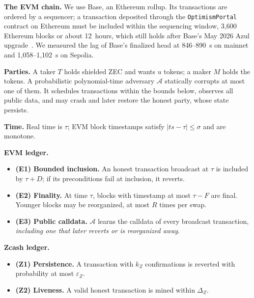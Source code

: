 \documentclass[10pt,letterpaper]{article}
\makeatletter
\renewcommand\section{\@startsection{section}{1}{\z@}{-1.3em}{0.45em}{\normalfont\large\bfseries}}
\theoremstyle{plain}
\theoremstyle{definition}
\newcommand{\fn}[1]{\texttt{#1}}
\makeatother
\begin{document}
\textbf{The EVM chain.} We use Base, an Ethereum rollup. Its transactions are ordered by a
sequencer; a transaction deposited through the \fn{OptimismPortal} contract on Ethereum must be
included within the sequencing window, 3{,}600 Ethereum blocks or about 12~hours, which still
holds after Base's May 2026 Azul upgrade~\cite{basereliab,opforced}. We measured the lag of
Base's finalized head at 846--890~s on mainnet and 1{,}058--1{,}102~s on Sepolia.

\section{Model and Goals}

\textbf{Parties.} A taker $T$ holds shielded ZEC and wants $u$ tokens; a maker $M$ holds the
tokens. A probabilistic polynomial-time adversary $\mathcal{A}$ statically corrupts at most one of
them. It schedules transactions within the bounds below, observes all public data, and may
crash and later restore the honest party, whose state persists.

\textbf{Time.} Real time is $\tau$; EVM block timestamps satisfy $|ts - \tau| \le \sigma$ and are
monotone.

\textbf{EVM ledger.}
\begin{itemize}\setlength\itemsep{0.05em}
\item \textbf{(E1) Bounded inclusion.} An honest transaction broadcast at $\tau$ is included by
$\tau + D$; if its preconditions fail at inclusion, it reverts.
\item \textbf{(E2) Finality.} At time $\tau$, blocks with timestamp at most $\tau - F$ are final.
Younger blocks may be reorganized, at most $R$ times per swap.
\item \textbf{(E3) Public calldata.} $\mathcal{A}$ learns the calldata of every broadcast
transaction, \emph{including one that later reverts or is reorganized away}.
\end{itemize}

\textbf{Zcash ledger.}
\begin{itemize}\setlength\itemsep{0.05em}
\item \textbf{(Z1) Persistence.} A transaction with $k_Z$ confirmations is reverted with
probability at most $\varepsilon_Z$.
\item \textbf{(Z2) Liveness.} A valid honest transaction is mined within $\Delta_Z$.
\end{itemize}
\end{document}

